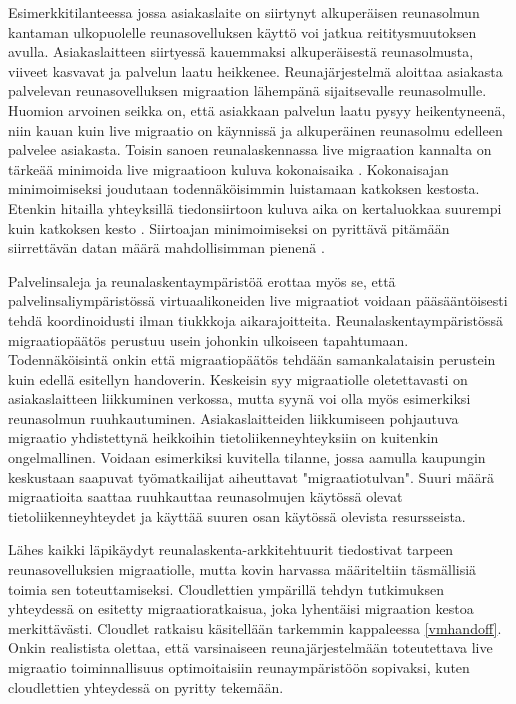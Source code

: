 Esimerkkitilanteessa jossa asiakaslaite on siirtynyt alkuperäisen reunasolmun kantaman ulkopuolelle reunasovelluksen käyttö voi jatkua reititysmuutoksen avulla. Asiakaslaitteen siirtyessä kauemmaksi alkuperäisestä reunasolmusta, viiveet kasvavat ja palvelun laatu heikkenee. Reunajärjestelmä aloittaa asiakasta palvelevan reunasovelluksen migraation lähempänä sijaitsevalle reunasolmulle.
Huomion arvoinen seikka on, että asiakkaan palvelun laatu pysyy heikentyneenä, niin kauan kuin live migraatio on käynnissä ja alkuperäinen reunasolmu edelleen palvelee asiakasta\cite{ha2015adaptive}. 
Toisin sanoen reunalaskennassa live migraation kannalta on tärkeää minimoida live migraatioon kuluva kokonaisaika \cite{ha2015adaptive}. 
Kokonaisajan minimoimiseksi joudutaan todennäköisimmin luistamaan katkoksen kestosta. 
Etenkin hitailla yhteyksillä tiedonsiirtoon kuluva aika on kertaluokkaa suurempi kuin katkoksen kesto \cite{ha2017you}.
Siirtoajan minimoimiseksi on pyrittävä pitämään siirrettävän datan määrä mahdollisimman pienenä \cite{ha2015adaptive}.





Palvelinsaleja ja reunalaskentaympäristöä erottaa myös se, että palvelinsaliympäristössä virtuaalikoneiden live migraatiot voidaan pääsääntöisesti tehdä koordinoidusti ilman tiukkkoja aikarajoitteita. 
Reunalaskentaympäristössä migraatiopäätös perustuu usein johonkin ulkoiseen tapahtumaan. Todennäköisintä onkin että migraatiopäätös tehdään samankalataisin perustein kuin edellä esitellyn handoverin. Keskeisin syy migraatiolle oletettavasti on asiakaslaitteen liikkuminen verkossa, mutta syynä voi olla myös esimerkiksi reunasolmun ruuhkautuminen. Asiakaslaitteiden liikkumiseen pohjautuva migraatio yhdistettynä heikkoihin tietoliikenneyhteyksiin on kuitenkin ongelmallinen. Voidaan esimerkiksi kuvitella tilanne, jossa aamulla kaupungin keskustaan saapuvat työmatkailijat aiheuttavat "migraatiotulvan". Suuri määrä migraatioita saattaa ruuhkauttaa reunasolmujen käytössä olevat tietoliikenneyhteydet ja käyttää suuren osan käytössä olevista resursseista. 


Lähes kaikki läpikäydyt reunalaskenta-arkkitehtuurit tiedostivat tarpeen reunasovelluksien migraatiolle, mutta kovin harvassa määriteltiin täsmällisiä toimia sen toteuttamiseksi.
Cloudlettien ympärillä tehdyn tutkimuksen yhteydessä on esitetty migraatioratkaisua, joka lyhentäisi migraation kestoa merkittävästi. Cloudlet ratkaisu käsitellään tarkemmin kappaleessa \ref{vmhandoff}. 
Onkin realistista olettaa, että varsinaiseen reunajärjestelmään toteutettava live migraatio toiminnallisuus optimoitaisiin reunaympäristöön sopivaksi, kuten cloudlettien yhteydessä on pyritty tekemään. 
